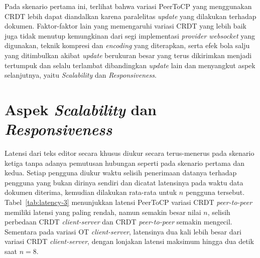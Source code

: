 Pada skenario pertama ini, terlihat bahwa variasi PeerToCP yang menggunakan CRDT lebih dapat diandalkan karena paralelitas \textit{update} yang dilakukan terhadap dokumen. Faktor-faktor lain yang memengaruhi variasi CRDT yang lebih baik juga tidak menutup kemungkinan dari segi implementasi \textit{provider websocket} yang digunakan, teknik kompresi dan \textit{encoding} yang diterapkan, serta efek bola salju yang ditimbulkan akibat \textit{update} berukuran besar yang terus dikirimkan menjadi tertumpuk dan selalu terlambat dibandingkan \textit{update} lain dan menyangkut aspek selanjutnya, yaitu \textit{Scalability} dan \textit{Responsiveness}.

\section{Aspek \textit{Scalability} dan \textit{Responsiveness}}

Latensi dari teks editor secara khusus diukur secara terus-menerus pada skenario ketiga tanpa adanya pemutusan hubungan seperti pada skenario pertama dan kedua. Setiap pengguna diukur waktu selisih penerimaan datanya terhadap pengguna yang bukan dirinya sendiri dan dicatat latensinya pada waktu data dokumen diterima, kemudian dilakukan rata-rata untuk $n$ pengguna tersebut. Tabel~\ref{tab:latency-3} menunjukkan latensi PeerToCP variasi CRDT \textit{peer-to-peer} memiliki latensi yang paling rendah, namun semakin besar nilai $n$, selisih perbedaan CRDT \textit{client-server} dan CRDT \textit{peer-to-peer} semakin mengecil. Sementara pada variasi OT \textit{client-server}, latensinya dua kali lebih besar dari variasi CRDT \textit{client-server}, dengan lonjakan latensi maksimum hingga dua detik saat $n = 8$.

